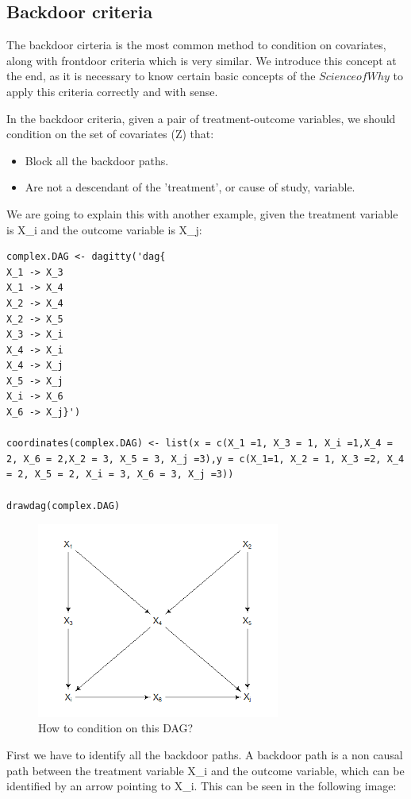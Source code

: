 \documentclass{article}
\begin{document}
\subsection{Backdoor criteria}
The backdoor cirteria is the most common method to condition on covariates, along with frontdoor criteria which is very similar.
We introduce this concept at the end, as it is necessary to know certain basic concepts of the \(Science of Why\) to apply this criteria correctly and with sense.\par
In the backdoor criteria, given a pair of treatment-outcome variables, we should condition on the set of covariates (Z) that:
\begin{itemize} \item Block all the backdoor paths. \item Are not a descendant of the 'treatment', or cause of study, variable.\end{itemize}
We are going to explain this with another example, given the treatment variable is X\_i and the outcome variable is X\_j:\par
\begin{lstlisting}
complex.DAG <- dagitty('dag{
X_1 -> X_3
X_1 -> X_4
X_2 -> X_4
X_2 -> X_5
X_3 -> X_i
X_4 -> X_i
X_4 -> X_j
X_5 -> X_j
X_i -> X_6
X_6 -> X_j}')

coordinates(complex.DAG) <- list(x = c(X_1 =1, X_3 = 1, X_i =1,X_4 = 2, X_6 = 2,X_2 = 3, X_5 = 3, X_j =3),y = c(X_1=1, X_2 = 1, X_3 =2, X_4 = 2, X_5 = 2, X_i = 3, X_6 = 3, X_j =3))

drawdag(complex.DAG)
\end{lstlisting}
\begin{figure}[h]
\caption{How to condition on this DAG?}
\includegraphics[width=8cm]{complex.DAG.png}
\centering
\end{figure}
First we have to identify all the backdoor paths. A backdoor path is a non causal path between the treatment variable X\_i and the outcome variable, which can be identified by an arrow pointing to X\_i. This can be seen in the following image:\par
\end{document}
